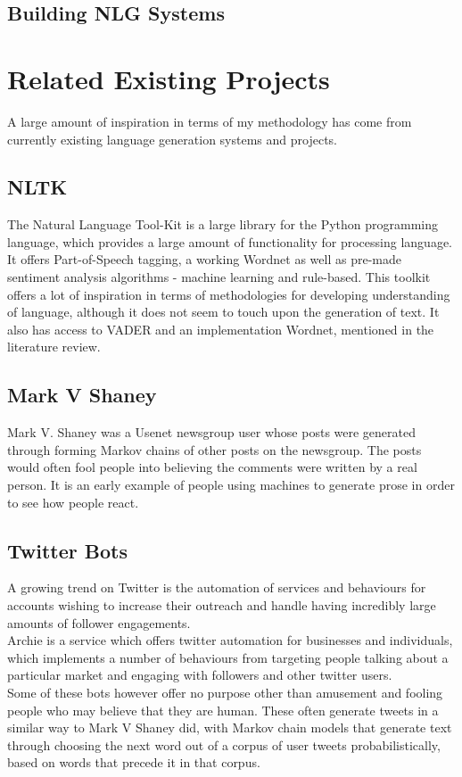 \subsection{Building NLG Systems}


\section{Related Existing Projects}
A large amount of inspiration in terms of my methodology has come from currently existing language generation systems and projects.
\subsection{NLTK}
The Natural Language Tool-Kit is a large library for the Python programming language, which provides a large amount of functionality for processing language. It offers Part-of-Speech tagging, a working Wordnet as well as pre-made sentiment analysis algorithms - machine learning and rule-based.
This toolkit offers a lot of inspiration in terms of methodologies for developing understanding of language, although it does not seem to touch upon the generation of text. It also has access to VADER and an implementation Wordnet, mentioned in the literature review.

\subsection{Mark V Shaney}
Mark V. Shaney was a Usenet newsgroup user whose posts were generated through forming Markov chains of other posts on the newsgroup. The posts would often fool people into believing the comments were written by a real person. It is an early example of people using machines to generate prose in order to see how people react. 

\subsection{Twitter Bots}
A growing trend on Twitter is the automation of services and behaviours for accounts wishing to increase their outreach and handle having incredibly large amounts of follower engagements. \\
%
Archie is a service which offers twitter automation for businesses and individuals, which implements a number of behaviours from targeting people talking about a particular market and engaging with followers and other twitter users. \\
%
Some of these bots however offer no purpose other than amusement and fooling people who may believe that they are human. These often generate tweets in a similar way to Mark V Shaney did, with Markov chain models that generate text through choosing the next word out of a corpus of user tweets probabilistically, based on words that precede it in that corpus.\\ 



